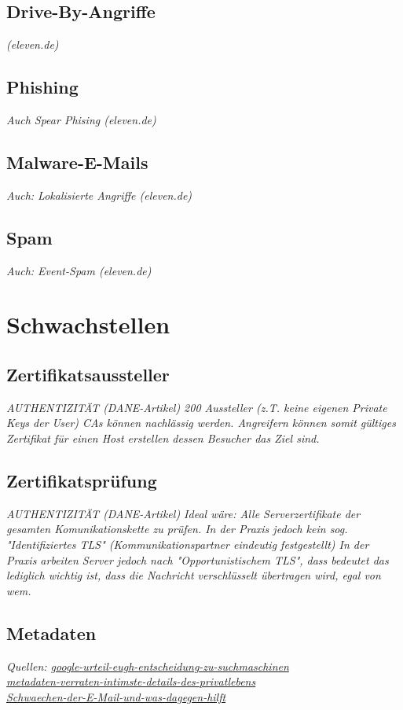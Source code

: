 \documentclass  [paper=a4,
				fontsize=12pt,
				listof=totoc,
				bibliography=totoc
				]{scrreprt}
\begin{document}
			\subsection{Drive-By-Angriffe}
\textsl{(eleven.de)}
			\subsection{Phishing}
\textsl{Auch Spear Phising (eleven.de)}
			\subsection{Malware-E-Mails}
\textsl{Auch: Lokalisierte Angriffe (eleven.de)}
			\subsection{Spam}
\textsl{Auch: Event-Spam (eleven.de)}

		\section{Schwachstellen}
			\subsection{Zertifikatsaussteller}
			\label{sec:zertifikatsaussteller}
\textsl{AUTHENTIZITÄT (DANE-Artikel)
200 Aussteller (z.T. keine eigenen Private Keys der User) CAs können nachlässig werden. Angreifern können somit gültiges Zertifikat für einen Host erstellen dessen Besucher das Ziel sind.}
			\subsection{Zertifikatsprüfung}
			\label{sec:zertifikatspruefung}
\textsl{AUTHENTIZITÄT (DANE-Artikel)
Ideal wäre: Alle Serverzertifikate der gesamten Komunikationskette zu prüfen. In der Praxis jedoch kein sog. "Identifiziertes TLS" (Kommunikationspartner eindeutig festgestellt) In der Praxis arbeiten Server jedoch nach "Opportunistischem TLS", dass bedeutet das lediglich wichtig ist, dass die Nachricht verschlüsselt übertragen wird, egal von wem.}
			\subsection{Metadaten}
			\label{sec:metadaten}
\textsl{Quellen:
\href{http://www.spiegel.de/netzwelt/netzpolitik/google-urteil-eugh-entscheidung-zu-suchmaschinen-a-969302.html}{google-urteil-eugh-entscheidung-zu-suchmaschinen} \\
\href{http://www.golem.de/news/stanford-experiment-metadaten-verraten-intimste-details-des-privatlebens-1403-105253.html}{metadaten-verraten-intimste-details-des-privatlebens}\\
\href{http://www.heise.de/ct/heft/2014-4-Die-Schwaechen-der-E-Mail-und-was-dagegen-hilft-2092851.html}{Schwaechen-der-E-Mail-und-was-dagegen-hilft}}
\color{black}
	
\end{document}

